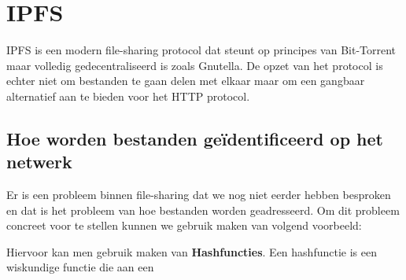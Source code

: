 \section{IPFS}

IPFS is een modern file-sharing protocol dat steunt op principes van Bit-Torrent maar volledig gedecentraliseerd is zoals Gnutella. De opzet van het protocol is echter niet om bestanden te gaan delen met elkaar maar om een gangbaar alternatief aan te bieden voor het HTTP protocol. 

\subsection{Hoe worden bestanden geïdentificeerd op het netwerk}
Er is een probleem binnen file-sharing dat we nog niet eerder hebben besproken en dat is het probleem van hoe bestanden worden geadresseerd. Om dit probleem concreet voor te stellen kunnen we gebruik maken van volgend voorbeeld:



Hiervoor kan men gebruik maken van \textbf{Hashfuncties}. Een hashfunctie is een wiskundige functie die aan een
